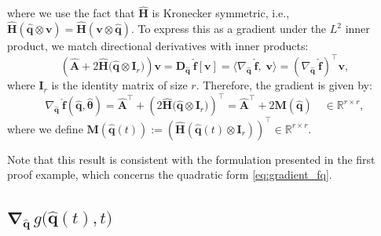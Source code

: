 where we use the fact that $\hat{\mathbf{H}}$ is Kronecker symmetric, i.e., $\hat{\mathbf{H}}(\hat{\mathbf{q}} \otimes \mathbf{v}) = \hat{\mathbf{H}}(\mathbf{v} \otimes \hat{\mathbf{q}})$.
To express this as a gradient under the $L^2$ inner product, we match directional derivatives with inner products:\\
$$
\left( \hat{\mathbf{A}} + 2\hat{\mathbf{H}}\bigl( \hat{\mathbf{q}} \otimes \mathbf{I}_r \bigr) \right) \mathbf{v} = \bm{D}_{\hat{\mathbf{q}}}~\hat{\mathbf{f}}[\mathbf{v}] = \langle \nabla_{\hat{\mathbf{q}}}~\hat{\mathbf{f}},\;\mathbf{v} \rangle = \left( \nabla_{\hat{\mathbf{q}}}~\hat{\mathbf{f}} \right)^{\top}  \mathbf{v},
$$
where $\mathbf{I}_r$ is the identity matrix of size $r$. Therefore, the gradient is given by:\\
\begin{equation}
    \nabla_{\hat{\mathbf{q}}}~\hat{\mathbf{f}}(\hat{\mathbf{q}}, \hat{\bm{\theta}}) = \hat{\mathbf{A}}^{\top} + \left( 2\hat{\mathbf{H}}\bigl( \hat{\mathbf{q}} \otimes \mathbf{I}_r \bigr) \right)^{\top} = \hat{\mathbf{A}}^{\top} + 2\mathbf{M}(\hat{\mathbf{q}}) \quad \in \mathbb{R}^{r \times r},
    \label{eq:gradient_1}
\end{equation}
where we define $\mathbf{M}(\hat{\mathbf{q}}(t)) := \left( \hat{\mathbf{H}}( \hat{\mathbf{q}}(t) \otimes \mathbf{I}_r ) \right)^{\top} \in \mathbb{R}^{r \times r}$.

Note that this result is consistent with the formulation presented in the first proof example, which concerns the quadratic form \eqref{eq:gradient_fq}.


\subsection{$\bm{\nabla}_{\hat{\mathbf{q}}}\,g\bigl(\hat{\mathbf{q}}(t),t\bigr)$}

